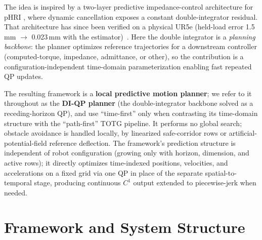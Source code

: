The idea is inspired by a two-layer predictive impedance-control
architecture for pHRI \cite{phri}, where dynamic cancellation exposes a
constant double-integrator residual. That architecture has since been verified on a physical UR5e (held-load error 1.5\,mm $\to$ 0.023\,mm with the estimator)~\cite{phri}. Here the double integrator is a
\emph{planning backbone}: the
planner optimizes reference trajectories for a downstream controller
(computed-torque, impedance, admittance, or other), so the contribution
is a configuration-independent time-domain parameterization enabling
fast repeated QP updates.

The resulting framework is a \textbf{local
predictive motion planner}; we
refer to it throughout as the \textbf{DI-QP planner} (the double-integrator
backbone solved as a receding-horizon QP), and use ``time-first'' only
when contrasting its time-domain structure with the ``path-first'' TOTG
pipeline. It performs no global search; obstacle avoidance is handled
locally, by linearized safe-corridor rows or artificial-potential-field
reference deflection. The framework's prediction structure is independent
of robot configuration (growing only with horizon, dimension, and active
rows); it directly optimizes time-indexed positions, velocities, and
accelerations on a fixed grid via one QP in place of the separate
spatial-to-temporal stage, producing continuous \(C^1\) output extended to
piecewise-jerk when needed.


\section{Framework and System
Structure}\label{ii.-mathematical-framework-and-system-structure}


